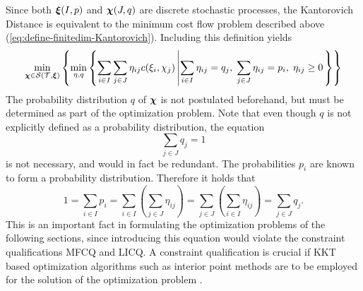 Since both $\boldsymbol\xi(I,p)$ and $\boldsymbol\chi(J,q)$ are discrete stochastic processes, the Kantorovich Distance is equivalent to the minimum cost flow problem described above (\ref{eq:define-finitedim-Kantorovich}).
Including this definition yields
\begin{equation}
  \label{eq:symbolic-optimization-with-minflow}
  \min_{\boldsymbol\chi\in\mathcal{S}(\mathcal{T},\boldsymbol\xi)}\left\{\min_{\eta,q}\left\{\sum_{i\in I}\sum_{j\in J}\eta_{ij}c(\xi_i,\chi_j)\left|\sum_{i\in I}\eta_{ij}=q_j,\;\sum_{j\in J}\eta_{ij}=p_i,\;\eta_{ij}\geq 0\right.\right\}\right\}
\end{equation}
The probability distribution $q$ of $\boldsymbol\chi$ is not postulated beforehand, but must be determined as part of the optimization problem.
Note that even though $q$ is not explicitly defined as a probability distribution, the equation
\begin{equation}
  \label{eq:q-schliessbedingung}
  \sum_{j\in J} q_j = 1
\end{equation}
is not necessary, and would in fact be redundant.
The probabilities $p_i$ are known to form a probability distribution. Therefore it holds that
\begin{equation}
  \label{eq:proof-sum-q-redundant}
  1 = \sum_{i\in I}p_i = \sum_{i\in I}\left(\sum_{j\in J}\eta_{ij}\right)=\sum_{j\in J}\left(\sum_{i\in I}\eta_{ij}\right)=\sum_{j\in J} q_j.
\end{equation}
This is an important fact in formulating the optimization problems of the following sections, since introducing this equation would violate the constraint qualifications MFCQ and LICQ.
A constraint qualification is crucial if KKT based optimization algorithms such as interior point methods are to be employed for the solution of the optimization problem \cite{Jongen2004}.

